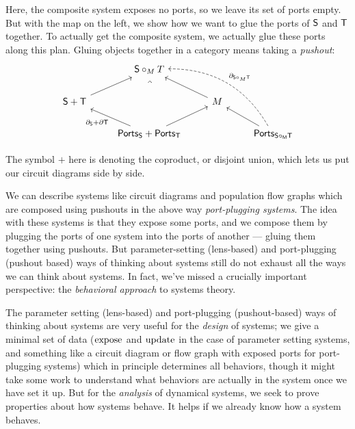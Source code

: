 \documentclass[DynamicalBook]{subfiles}
\begin{document}
Here, the composite system exposes no ports, so we leave its set of ports empty.
But with the map on the left, we show how we want to glue the ports of $\mathsf{S}$
and $\mathsf{T}$ together. To actually get the composite system, we actually glue
these ports along this plan. Gluing objects together in a category means taking
a \emph{pushout}:
\[
\begin{tikzcd}
	& {\Sys{S} \circ_M T} \\
	{\Sys{S} + \Sys{T}} && M \\
	& {\Ports{S} + \Ports{T}} && {\Ports{S \circ_M T}}
	\arrow["{\partial_{\Sys{S}} + \partial{\Sys{T}}}", from=3-2, to=2-1]
	\arrow[from=3-2, to=2-3]
	\arrow[from=3-4, to=2-3]
	\arrow[from=2-3, to=1-2]
	\arrow[from=2-1, to=1-2]
	\arrow["\ulcorner"{anchor=center, pos=0.125, rotate=-45}, draw=none, from=1-2, to=3-2]
	\arrow["{\partial_{\Sys{S} \circ_{M} \Sys{T}}}"', bend right = 30, dashed, from=3-4, to=1-2]
\end{tikzcd}
\]

The symbol $+$ here is denoting the coproduct, or disjoint union, which lets us
put our circuit diagrams side by side.

We can describe systems like circuit diagrams and population flow graphs which
are composed using pushouts in the above way \emph{port-plugging
  systems}. The idea with these systems is that they expose some ports, and we
compose them by plugging the ports of one system into the ports of another ---
gluing them together using pushouts. But parameter-setting (lens-based) and
port-plugging (pushout based) ways of thinking about systems still do not exhaust all the ways we can
think about systems. In fact, we've missed a crucially important perspective:
the \emph{behavioral approach} to systems theory.

The parameter setting (lens-based) and port-plugging (pushout-based) ways of thinking about systems are very useful for the \emph{design} of systems; we give
a minimal set of data ($\mathrm{expose}_{\mathsf{}}$ and $\mathrm{update}_{\mathsf{}}$ in the case of parameter
setting systems, and something like a circuit diagram or flow graph with exposed
ports for port-plugging systems) which in principle determines all behaviors, though it
might take some work to understand what behaviors are actually in the system
once we have set it up. But for the \emph{analysis} of dynamical systems, we
seek to prove properties about how systems behave. It helps if we
already know how a system behaves.
\end{document}
